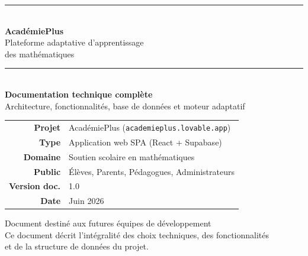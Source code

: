 \documentclass[11pt,a4paper]{report}
\begin{document}
\begin{titlepage}
\centering
\vspace*{1.5cm}
{\color{apaccent}\rule{\linewidth}{2pt}}\\[0.6cm]
{\Huge\bfseries\color{apblue} AcadémiePlus}\\[0.4cm]
{\LARGE\color{apgray} Plateforme adaptative d'apprentissage\\ des mathématiques}\\[0.5cm]
{\color{apaccent}\rule{\linewidth}{2pt}}\\[1.4cm]

{\Large\bfseries Documentation technique complète}\\[0.4cm]
{\large\color{apgray} Architecture, fonctionnalités, base de données et moteur adaptatif}\\[2.2cm]

\begin{tcolorbox}[width=0.8\linewidth,colback=aplight,colframe=apblue,arc=4pt]
\centering
\begin{tabular}{rl}
\textbf{Projet} & AcadémiePlus (\texttt{academieplus.lovable.app})\\
\textbf{Type} & Application web SPA (React + Supabase)\\
\textbf{Domaine} & Soutien scolaire en mathématiques\\
\textbf{Public} & Élèves, Parents, Pédagogues, Administrateurs\\
\textbf{Version doc.} & 1.0\\
\textbf{Date} & Juin 2026\\
\end{tabular}
\end{tcolorbox}

\vfill
{\large\color{apgray}\faGraduationCap\quad Document destiné aux futures équipes de développement}\\[0.4cm]
{\small\color{apgray} Ce document décrit l'intégralité des choix techniques, des fonctionnalités\\ et de la structure de données du projet.}
\end{titlepage}

\tableofcontents
\thispagestyle{empty}
\clearpage












\end{document}
